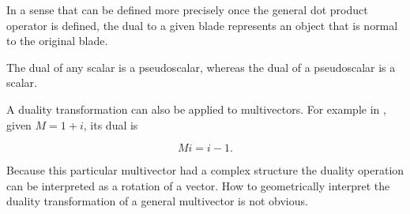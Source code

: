 In a sense that can be defined more precisely once the general dot product operator is defined, the dual to a given blade represents an object that is normal to the original blade.

The dual of any scalar is a pseudoscalar, whereas the dual of a pseudoscalar is a scalar.

A duality transformation can also be applied to multivectors.  
For example in , given \( M = 1 + i\), its dual is

\begin{dmath}\label{eqn:dual:n}
M i = i - 1.
\end{dmath}

Because this particular multivector had a complex structure the duality operation can be interpreted as a rotation of a vector.  
How to geometrically interpret the duality transformation of a general multivector is not obvious.

